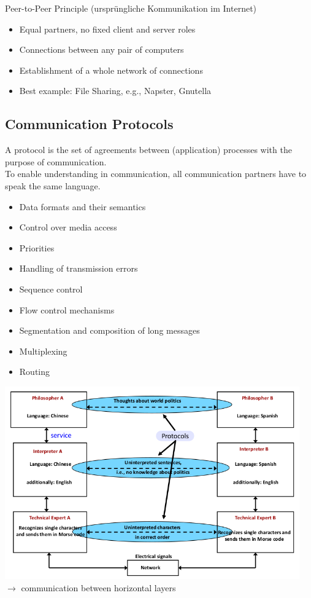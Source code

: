 \documentclass[11pt,ngerman]{article}
\begin{document}
Peer-to-Peer	Principle (ursprüngliche Kommunikation im Internet)
\begin{itemize}[noitemsep]
	\item Equal	partners,	no	fixed	client	and	server	roles
	\item Connections	between	any	pair	of	computers
	\item Establishment	of	a	whole	network	of	connections
	\item Best	example:	File	Sharing,	e.g.,	Napster,	Gnutella
\end{itemize}

\subsection{Communication	Protocols}

A	protocol	is	the	set	of	agreements	between	(application)	processes	with	the	purpose	of	
communication.\\
To	enable	understanding	in	communication,	all	communication	partners	have	to	speak	the	
same	language.
\begin{itemize}[noitemsep]
\item Data	formats	and	their	semantics
\item Control	over	media	access
\item Priorities
\item Handling	of	transmission	errors
\item Sequence	control
\item Flow	control	mechanisms
\item Segmentation	and	composition	of	long	messages
\item Multiplexing
\item Routing
\end{itemize}
	\includegraphics[width=5in]{images/Selection_006.png}\\
	$\rightarrow$ communication between horizontal layers
	
\end{document}
